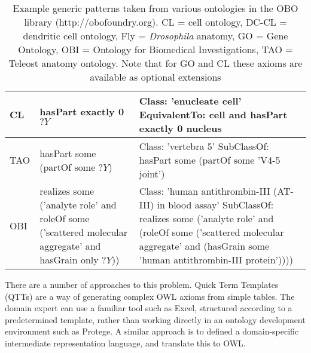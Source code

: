 \documentclass{llncs}
\begin{document}
\begin{table}
\begin{tabular}{ | p{1.1cm} | p{4cm} | p{7cm} | }
      \hline

      CL &

      hasPart exactly 0 $?Y$

      &

      Class: 'enucleate cell' \newline
      EquivalentTo: cell and hasPart exactly 0 nucleus

      \\

      \hline

      TAO &

      hasPart some (partOf some $?Y$)

      &

      Class: 'vertebra 5' \newline
      SubClassOf: hasPart some (partOf some 'V4-5 joint')

      \\

      \hline

      OBI &

      realizes some ('analyte role' and roleOf some ('scattered molecular aggregate' and hasGrain only $?Y$))

      &

      Class: 'human antithrombin-III (AT-III) in blood assay' \newline
      SubClassOf: realizes some ('analyte role' and (roleOf some 
      ('scattered molecular aggregate' and (hasGrain some 'human antithrombin-III protein'))))

      \\

      \hline
    \end{tabular}
    \caption{Example generic patterns taken from various ontologies in
      the OBO library (http://obofoundry.org). CL = cell ontology,
      DC-CL = dendritic cell ontology, Fly = \emph{Drosophila}
      anatomy, GO = Gene Ontology, OBI = Ontology for Biomedical
      Investigations, TAO = Teleost anatomy ontology. Note that for GO
      and CL these axioms are available as optional
      extensions\cite{Mungall_GOXP_2010}\cite{Diehl_ICBO_2009}}
    \label{tab:example-templates}
  \end{table}

There are a number of approaches to this problem. Quick Term Templates
(QTTs)\cite{QTT2009} are a way of generating complex OWL axioms from
simple tables. The domain expert can use a familiar tool such as
Excel, structured according to a predetermined template, rather than
working directly in an ontology development environment such as
Protege. A similar approach is to defined a domain-specific
intermediate representation language, and translate this to OWL.
\end{document}
